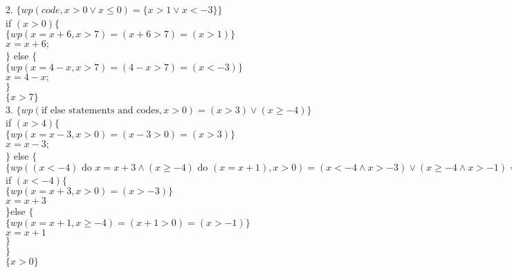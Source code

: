 \documentclass[12pt]{article}
\begin{document}
	2. $\{wp(code,x>0 \lor x \leq 0) = \{x>1 \lor x<-3\}\}$\\
	\hspace*{2.5cm} if $(x>0)\{$\\
	\hspace*{2.5cm}\qquad $\{wp(x=x+6,x>7)=(x+6>7)=(x>1)\}$\\
	\hspace*{2.5cm}\quad $x=x+6;$\\
	\hspace*{2.5cm} $\}$ else $\{$\\
	\hspace*{2.5cm}\qquad $\{wp(x=4-x,x>7) = (4-x>7) = (x<-3)\}$\\
	\hspace*{2.5cm}\quad $x=4-x;$\\
	\hspace*{2.5cm} $\}$\\
	\hspace*{2.5cm}\qquad $\{x>7\}$\\
	
	3. $\{wp(\text{if else statements and codes},x>0)=(x>3) \lor (x \ge -4 )\}$\\
	\hspace*{2.5cm} if $(x>4)\{$\\
	\hspace*{2.5cm}\qquad $\{wp(x=x-3,x>0)=(x-3>0)=(x>3)\}$\\
	\hspace*{2.5cm}\quad $x=x-3;$\\
	\hspace*{2.5cm}\quad $\}$ else $\{$\\
	\hspace*{2.5cm}\qquad\qquad $\{wp((x<-4) \text{ do } x=x+3 \land (x \geq -4) \text{ do } (x = x+1),x>0)=(x<-4\land x>-3)\lor (x\ge -4 \land x>-1)=(x\ge-4)\}$\\
	\hspace*{3.5cm}\qquad if $(x<-4)\{$\\
	\hspace*{3.5cm}\qquad\qquad $\{wp(x=x+3,x>0)=(x>-3)\}$\\
	\hspace*{3.5cm}\qquad\quad $x=x+3$\\
	\hspace*{3.5cm}\qquad\}else $\{$\\
	\hspace*{3.5cm}\qquad\qquad $\{wp(x=x+1,x \geq -4)=(x+1>0)=(x>-1)\}$\\
	\hspace*{3.5cm}\qquad\quad $x=x+1$\\
	\hspace*{2.5cm}\qquad$\}$\\
	$\}$\\
	\hspace*{2.5cm}\qquad$\{x>0\}$\\
	
\end{document}
